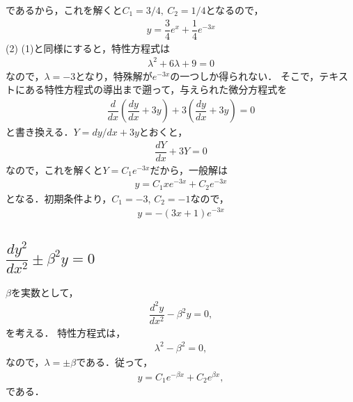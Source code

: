 であるから，これを解くと$C_1=3/4,~C_2 = 1/4$となるので，
\begin{align}
 y = \dfrac{3}{4}e^{x} + \dfrac{1}{4}e^{-3x} 
\end{align}
%
(2) (1)と同様にすると，特性方程式は
\begin{align}
  \lambda^2 + 6\lambda + 9 = 0 
\end{align}
なので，$\lambda = -3$となり，特殊解が$e^{-3x}$の一つしか得られない．
そこで，テキストにある特性方程式の導出まで遡って，与えられた微分方程式を
\begin{align}
  \dfrac{d}{dx}\left(\dfrac{dy}{dx}+3y\right) + 3\left(\dfrac{dy}{dx}+3y\right) = 0 
\end{align}
と書き換える．$Y=dy/dx+3y$とおくと，
\begin{align}
  \dfrac{dY}{dx} + 3Y = 0 
\end{align}
なので，これを解くと$Y=C_1 e^{-3x}$だから，一般解は
\begin{align}
 y = C_1 x e^{-3x} + C_2 e^{-3x}
\end{align}
となる．初期条件より，$C_1=-3$, $C_2=-1$なので，
\begin{align}
  y = -\left(3x+1\right)e^{-3x} 
\end{align}
%
\newpage
%
%
\subsection{$\dfrac{dy^2}{dx^2} \pm \beta^2 y =0$}
$\beta$を実数として，
\begin{align}
  \dfrac{d^2 y}{dx^2} - \beta^{2}y = 0, \label{eq:PDE_05_01}
\end{align}
を考える．
特性方程式は，
\begin{align}
  \lambda^2 -\beta^2 = 0,
\end{align}
なので，$\lambda = \pm \beta$である．従って，
\begin{align}
  y = C_{1} e^{-\beta x} + C_{2} e^{\beta x},
\end{align}
である．

